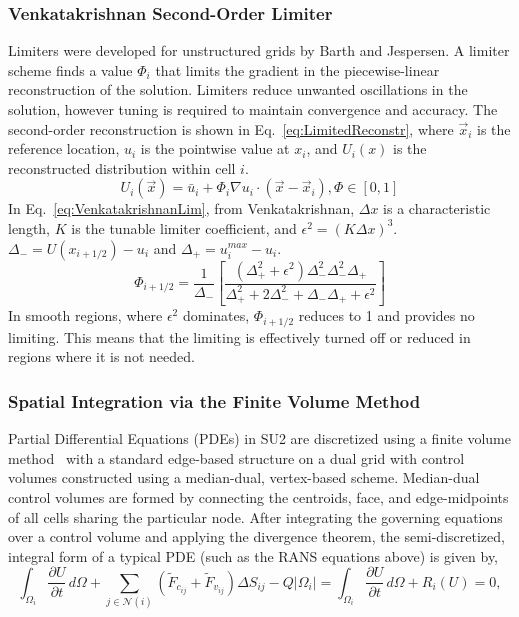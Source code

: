 \subsubsection*{Venkatakrishnan Second-Order Limiter}
Limiters were developed for unstructured grids by Barth and Jespersen\cite{barth1989}. A limiter scheme finds a value $\Phi_i$ that limits the gradient in the piecewise-linear reconstruction of the solution. Limiters reduce unwanted oscillations in the solution, however tuning is required to maintain convergence and accuracy. The second-order reconstruction is shown in Eq.~\ref{eq:LimitedReconstr}, where $\vec{x}_i$ is the reference location, $u_i$ is the pointwise value at $x_i$, and $U_i(x)$ is the reconstructed distribution within cell $i$.
\begin{equation}\label{eq:LimitedReconstr}
U_i(\vec{x}) = \bar{u}_i + \Phi_i \nabla u_i \cdot (\vec{x}-\vec{x}_i ), \Phi\in [0,1]
\end{equation}
In Eq.~\ref{eq:VenkatakrishnanLim}, from Venkatakrishnan\cite{Venkatakrishnan:1993}, $\Delta x$ is a characteristic length, $K$ is the tunable limiter coefficient, and $\epsilon^2 = (K\Delta x)^3$. $\Delta_-=U(x_{i+1/2})-u_i$ and $\Delta_+ = u_i^{max}-u_i$. 
\begin{equation}\label{eq:VenkatakrishnanLim}
\Phi_{i+1/2} = \frac{1}{\Delta_-}\left[ \frac{(\Delta_+^2+\epsilon^2)\Delta_-^2\Delta_-^2\Delta_+}{\Delta_+^2+2\Delta_-^2+\Delta_-\Delta_++\epsilon^2}\right]
\end{equation}
In smooth regions, where $\epsilon^2$ dominates,  $\Phi_{i+1/2}$ reduces to 1 and provides no limiting. This means that the limiting is effectively turned off or reduced in regions where it is not needed. 

\subsubsection*{Spatial Integration via the Finite Volume Method}

Partial Differential Equations (PDEs) in SU2 are discretized using a finite volume method~\cite{barth95, hirsch1984,quarteroni97, jameson01, leveque02, wesseling00, jameson:1995a, jameson:1995b, toro1999} with a standard edge-based structure on a dual grid with control volumes constructed using a median-dual, vertex-based scheme. Median-dual control volumes are formed by connecting the centroids, face, and edge-midpoints of all cells sharing the particular node. After integrating the governing equations over a control volume and applying the divergence theorem, the semi-discretized, integral form of a typical PDE (such as the RANS equations above) is given by,
\begin{equation} \label{eq:DiscretizedEq}
\int_{\Omega_i}{\frac{\partial{U}}{\partial{t}}}\,d\Omega + \sum_{j \in \mathcal{N}(i)}(\tilde{F}_{c_{ij}}+\tilde{F}_{v_{ij}})\Delta{S}_{ij} -Q|\Omega_i| = \int_{\Omega_i}{\frac{\partial{U}}{\partial{t}}}\,d\Omega + R_i(U) = 0,
\end{equation}
 
